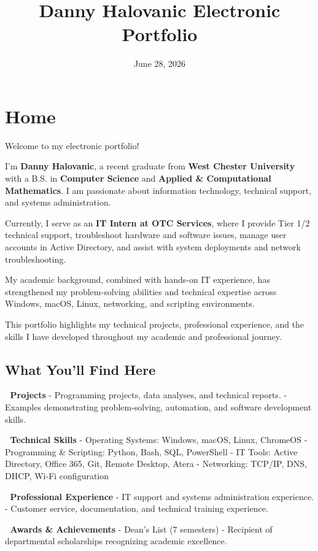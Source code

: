 \documentclass[
]{book}
\title{Danny Halovanic \textbar{} Electronic Portfolio}
\author{}
\date{\vspace{-2.5em}June 28, 2026}
\begin{document}
\maketitle

{
\setcounter{tocdepth}{1}
\tableofcontents
}
\chapter{Home}\label{home}

Welcome to my electronic portfolio!

I'm \textbf{Danny Halovanic}, a recent graduate from \textbf{West Chester University} with a B.S. in \textbf{Computer Science} and \textbf{Applied \& Computational Mathematics}. I am passionate about information technology, technical support, and systems administration.

Currently, I serve as an \textbf{IT Intern at OTC Services}, where I provide Tier 1/2 technical support, troubleshoot hardware and software issues, manage user accounts in Active Directory, and assist with system deployments and network troubleshooting.

My academic background, combined with hands-on IT experience, has strengthened my problem-solving abilities and technical expertise across Windows, macOS, Linux, networking, and scripting environments.

This portfolio highlights my technical projects, professional experience, and the skills I have developed throughout my academic and professional journey.

\section{What You'll Find Here}\label{what-youll-find-here}

📌 \textbf{Projects}
- Programming projects, data analyses, and technical reports.
- Examples demonstrating problem-solving, automation, and software development skills.

📌 \textbf{Technical Skills}
- Operating Systems: Windows, macOS, Linux, ChromeOS
- Programming \& Scripting: Python, Bash, SQL, PowerShell
- IT Tools: Active Directory, Office 365, Git, Remote Desktop, Atera
- Networking: TCP/IP, DNS, DHCP, Wi-Fi configuration

📌 \textbf{Professional Experience}
- IT support and systems administration experience.
- Customer service, documentation, and technical training experience.

📌 \textbf{Awards \& Achievements}
- Dean's List (7 semesters)
- Recipient of departmental scholarships recognizing academic excellence.
\end{document}
